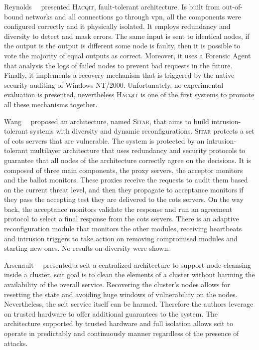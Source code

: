 Reynolds~\etal{}~\cite{Reynolds:2002} presented \textsc{Hacqit}, fault-tolerant architecture. 
Is built from out-of-bound networks and all connections go through \gls{vpn}, all the components were configured correctly and it physically isolated.
It employs redundancy and diversity to detect and mask errors.
The same input is sent to identical nodes, if the output is the output is different some node is faulty, then it is possible to vote the majority of equal outputs as correct.
Moreover, it uses a Forensic Agent that analysis the logs of failed nodes to prevent bad requests in the future.
Finally, it implements a recovery mechanism that is triggered by the native security auditing of Windows NT/2000.
Unfortunately, no experimental evaluation is presented, nevertheless \textsc{Hacqit} is one of the first systems to promote all these mechanisms together.


Wang~\etal{}~\cite{Wang:2003} proposed an architecture, named \textsc{Sitar}, that aims to build intrusion-tolerant systems with diversity and dynamic reconfigurations. 
\textsc{Sitar} protects a set of \gls{cots} servers that are vulnerable. 
The system is protected by an intrusion-tolerant multilayer architecture that uses redundancy and security protocols to guarantee that all nodes of the architecture correctly agree on the decisions.
It is composed of three main components, the proxy servers, the acceptor monitors and the ballot monitors.
These proxies receive the requests to audit them based on the current threat level, and then they propagate to acceptance monitors if they pass the accepting test they are delivered to the \gls{cots} servers. 
On the way back, the acceptance monitors validate the response and run an agreement protocol to select a final response from the \gls{cots} servers.
There is an adaptive reconfiguration module that monitors the other modules, receiving heartbeats and intrusion triggers to take action on removing compromised modules and starting new ones.
No results on diversity were shown.


Arsenault~\etal{}~\cite{Arsenault:2007} presented a \gls{scit} a centralized architecture to support node cleansing inside a cluster.
\gls{scit} goal is to clean the elements of a cluster without harming the availability of the overall service.
Recovering the cluster's nodes allows for resetting the state and avoiding huge windows of vulnerability on the nodes.
Nevertheless, the \gls{scit} service itself can be harmed. Therefore the authors leverage on trusted hardware to offer additional guarantees to the system.
The architecture supported by trusted hardware and full isolation allows \gls{scit} to operate in predictably and continuously manner regardless of the presence of attacks.

